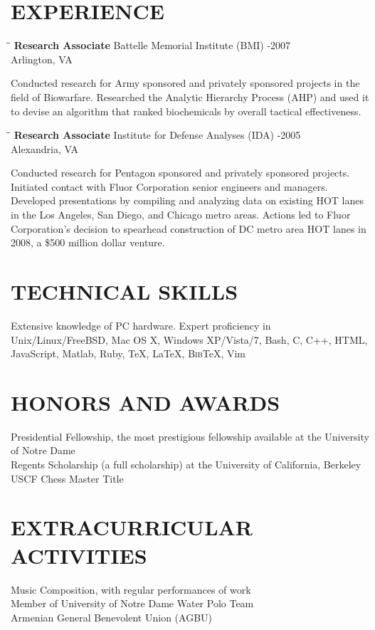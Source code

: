 \documentclass{resume}
\begin{document}
\begin{resume}
	 \section{EXPERIENCE}
	\vspace{-0.1in}	
	\begin{tabbing}
		\hspace{2.3in}\= \hspace{2.6in}\= \kill
		{\bf Research Associate} \>Battelle Memorial Institute (BMI)     
		-2007 \\
		\>Arlington, VA
	\end{tabbing}\vspace{-15pt}    
	Conducted research for Army sponsored and privately sponsored projects 
	in the field of Biowarfare. Researched the Analytic Hierarchy Process 
	(AHP) and used it to devise an algorithm that ranked biochemicals by 
	overall tactical effectiveness.
	\begin{tabbing}
		\hspace{2.3in}\= \hspace{2.6in}\= \kill
		{\bf Research Associate } \>Institute for Defense Analyses (IDA) -2005\\
		\>Alexandria, VA
	\end{tabbing}\vspace{-15pt}
	Conducted research for Pentagon sponsored and privately sponsored 
	projects. Initiated contact with Fluor Corporation senior engineers and 
	managers. Developed presentations by compiling and analyzing data on 
	existing HOT lanes in the Los Angeles, San Diego, and Chicago metro 
	areas.  Actions led to Fluor Corporation's decision to spearhead 
	construction of DC metro area HOT lanes in 2008, a \$500 million dollar 
	venture.

	\section{TECHNICAL SKILLS} \vspace{0.05in}
	Extensive knowledge of PC hardware. Expert proficiency in 
Unix/Linux/FreeBSD, Mac OS X, Windows XP/Vista/7, Bash, C, C++, HTML, 
JavaScript, Matlab, Ruby, \TeX{}, \LaTeX{}, B\textsc{ib}\TeX{}, Vim \\

	\section{HONORS AND AWARDS} \vspace{0.05in}
	Presidential Fellowship, the most prestigious fellowship available at the 
	University of Notre Dame \\
	Regents Scholarship (a full scholarship) at the University of California, 
	Berkeley \\
	USCF Chess Master Title

	\section{EXTRACURRICULAR ACTIVITIES}
	\vspace{0.05in}
	Music Composition, with regular performances of work\\
	Member of University of Notre Dame Water Polo Team\\
	Armenian General Benevolent Union (AGBU)\\
\end{resume}
\end{document}
